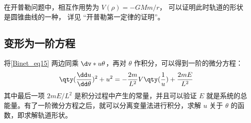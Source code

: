 在开普勒问题中，相互作用势为 $V(\rho)=-GMm/r$， 可以证明此时轨道的形状是圆锥曲线的一种， 详见 “开普勒第一定律的证明”。

\subsection{变形为一阶方程}
将\autoref{Binet_eq15} 两边同乘 $\dv*{u}{\theta}$，再对 $\theta$ 作积分，可以得到一阶的微分方程：
\begin{equation}\label{Binet_eq3}
\qty(\frac{\dd u}{\dd \theta})^2+u^2=-\frac{2m}{L^2}V\qty(\frac{1}{u})+\frac{2 m E}{L^2}
\end{equation}
其中最后一项 $2mE/L^2$ 是积分过程中产生的常量，并且可以验证 $E$ 就是系统的总能量。有了一阶微分方程之后，就可以分离变量法进行积分，求解 $u$ 关于 $\theta$ 的函数，即求解轨道形状。
